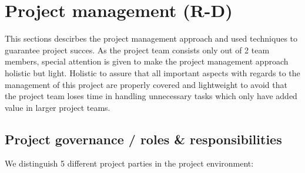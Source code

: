 \section{Project management (R-D)}
\label{sec:project-management}
This sections descirbes the project management approach and used techniques to guarantee project succes.
As the project team consists only out of 2 team members, special attention is given to make the project management approach holistic but light.
Holistic to assure that all important aspects with regards to the management of this project are properly covered and lightweight to avoid that the project team loses time in handling unnecessary tasks which only have added value in larger project teams.
\subsection{Project governance / roles \& responsibilities}
We distinguish 5 different project parties in the project environment:
